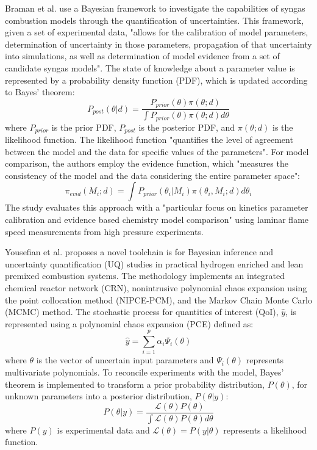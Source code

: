 Braman et al.\cite{braman_bayesian_2013} use a Bayesian framework to investigate the capabilities of syngas combustion models through the quantification of uncertainties. This framework, given a set of experimental data, "allows for the calibration of model parameters, determination of uncertainty in those parameters, propagation of that uncertainty into simulations, as well as determination of model evidence from a set of candidate syngas models". The state of knowledge about a parameter value is represented by a probability density function (PDF), which is updated according to Bayes' theorem:\begin{equation}P_{post}(\theta|d)=\frac{P_{prior}(\theta)\pi(\theta;d)}{\int P_{prior}(\theta)\pi(\theta;d)d\theta}\end{equation}where $P_{prior}$ is the prior PDF, $P_{post}$ is the posterior PDF, and $\pi(\theta;d)$ is the likelihood function. The likelihood function "quantifies the level of agreement between the model and the data for specific values of the parameters". For model comparison, the authors employ the evidence function, which "measures the consistency of the model and the data considering the entire parameter space":\begin{equation}\pi_{evid}(M_{i};d)=\int P_{prior}(\theta_{i}|M_{i})\pi(\theta_{i},M_{i};d)d\theta_{i}\end{equation}The study evaluates this approach with a "particular focus on kinetics parameter calibration and evidence based chemistry model comparison" using laminar flame speed measurements from high pressure experiments.


Yousefian et al.\cite{yousefian_bayesian_2021} proposes a novel toolchain is for Bayesian inference and uncertainty quantification (UQ) studies in practical hydrogen enriched and lean premixed combustion systems. The methodology implements an integrated chemical reactor network (CRN), nonintrusive polynomial chaos expansion using the point collocation method (NIPCE-PCM), and the Markov Chain Monte Carlo (MCMC) method. The stochastic process for quantities of interest (QoI), $\hat{y}$, is represented using a polynomial chaos expansion (PCE) defined as:
\begin{equation}
	\hat{y} = \sum_{i=1}^{p} \alpha_{i} \Psi_{i}(\theta)
\end{equation}
where $\theta$ is the vector of uncertain input parameters and $\Psi_{i}(\theta)$ represents multivariate polynomials. To reconcile experiments with the model, Bayes' theorem is implemented to transform a prior probability distribution, $P(\theta)$, for unknown parameters into a posterior distribution, $P(\theta|y)$:
\begin{equation}
	P(\theta|y) = \frac{\mathcal{L}(\theta)P(\theta)}{\int \mathcal{L}(\theta)P(\theta)d\theta}
\end{equation}
where $P(y)$ is experimental data and $\mathcal{L}(\theta) = P(y|\theta)$ represents a likelihood function.



